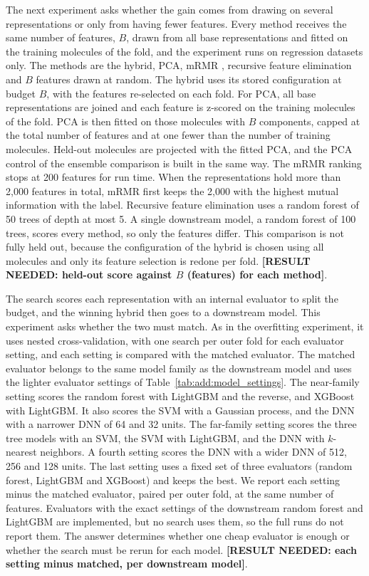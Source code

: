 The next experiment asks whether the gain comes from drawing on several representations or only from having fewer features. Every method receives the same number of features, $B$, drawn from all base representations and fitted on the training molecules of the fold, and the experiment runs on regression datasets only. The methods are the hybrid, PCA, mRMR \citep{Peng2005}, recursive feature elimination \citep{Guyon2002} and $B$ features drawn at random. The hybrid uses its stored configuration at budget $B$, with the features re-selected on each fold. For PCA, all base representations are joined and each feature is z-scored on the training molecules of the fold. PCA is then fitted on those molecules with $B$ components, capped at the total number of features and at one fewer than the number of training molecules. Held-out molecules are projected with the fitted PCA, and the PCA control of the ensemble comparison is built in the same way. The mRMR ranking stops at 200 features for run time. When the representations hold more than 2,000 features in total, mRMR first keeps the 2,000 with the highest mutual information with the label. Recursive feature elimination uses a random forest of 50 trees of depth at most 5. A single downstream model, a random forest of 100 trees, scores every method, so only the features differ. This comparison is not fully held out, because the configuration of the hybrid is chosen using all molecules and only its feature selection is redone per fold. \textbf{[RESULT NEEDED: held-out score against $B$ (features) for each method]}.

The search scores each representation with an internal evaluator to split the budget, and the winning hybrid then goes to a downstream model. This experiment asks whether the two must match. As in the overfitting experiment, it uses nested cross-validation, with one search per outer fold for each evaluator setting, and each setting is compared with the matched evaluator. The matched evaluator belongs to the same model family as the downstream model and uses the lighter evaluator settings of Table~\ref{tab:add:model_settings}. The near-family setting scores the random forest with LightGBM and the reverse, and XGBoost with LightGBM. It also scores the SVM with a Gaussian process, and the DNN with a narrower DNN of 64 and 32 units. The far-family setting scores the three tree models with an SVM, the SVM with LightGBM, and the DNN with $k$-nearest neighbors. A fourth setting scores the DNN with a wider DNN of 512, 256 and 128 units. The last setting uses a fixed set of three evaluators (random forest, LightGBM and XGBoost) and keeps the best. We report each setting minus the matched evaluator, paired per outer fold, at the same number of features. Evaluators with the exact settings of the downstream random forest and LightGBM are implemented, but no search uses them, so the full runs do not report them. The answer determines whether one cheap evaluator is enough or whether the search must be rerun for each model. \textbf{[RESULT NEEDED: each setting minus matched, per downstream model]}.

